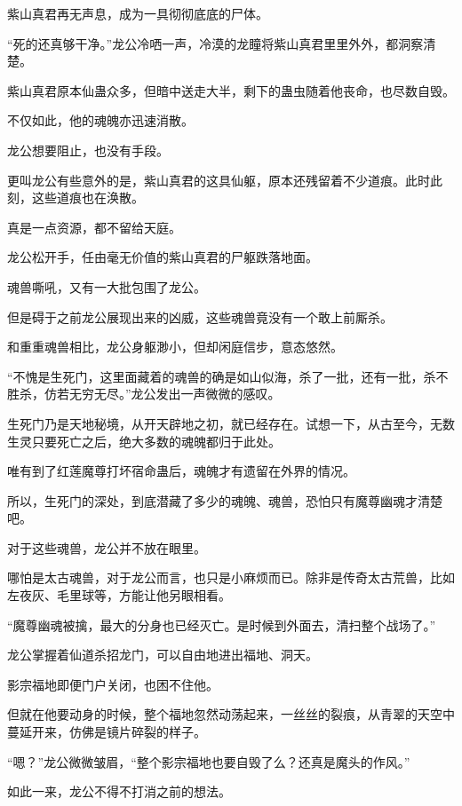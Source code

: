 
\begin{this_body}

紫山真君再无声息，成为一具彻彻底底的尸体。

“死的还真够干净。”龙公冷哂一声，冷漠的龙瞳将紫山真君里里外外，都洞察清楚。

紫山真君原本仙蛊众多，但暗中送走大半，剩下的蛊虫随着他丧命，也尽数自毁。

不仅如此，他的魂魄亦迅速消散。

龙公想要阻止，也没有手段。

更叫龙公有些意外的是，紫山真君的这具仙躯，原本还残留着不少道痕。此时此刻，这些道痕也在涣散。

真是一点资源，都不留给天庭。

龙公松开手，任由毫无价值的紫山真君的尸躯跌落地面。

魂兽嘶吼，又有一大批包围了龙公。

但是碍于之前龙公展现出来的凶威，这些魂兽竟没有一个敢上前厮杀。

和重重魂兽相比，龙公身躯渺小，但却闲庭信步，意态悠然。

“不愧是生死门，这里面藏着的魂兽的确是如山似海，杀了一批，还有一批，杀不胜杀，仿若无穷无尽。”龙公发出一声微微的感叹。

生死门乃是天地秘境，从开天辟地之初，就已经存在。试想一下，从古至今，无数生灵只要死亡之后，绝大多数的魂魄都归于此处。

唯有到了红莲魔尊打坏宿命蛊后，魂魄才有遗留在外界的情况。

所以，生死门的深处，到底潜藏了多少的魂魄、魂兽，恐怕只有魔尊幽魂才清楚吧。

对于这些魂兽，龙公并不放在眼里。

哪怕是太古魂兽，对于龙公而言，也只是小麻烦而已。除非是传奇太古荒兽，比如左夜灰、毛里球等，方能让他另眼相看。

“魔尊幽魂被擒，最大的分身也已经灭亡。是时候到外面去，清扫整个战场了。”

龙公掌握着仙道杀招龙门，可以自由地进出福地、洞天。

影宗福地即便门户关闭，也困不住他。

但就在他要动身的时候，整个福地忽然动荡起来，一丝丝的裂痕，从青翠的天空中蔓延开来，仿佛是镜片碎裂的样子。

“嗯？”龙公微微皱眉，“整个影宗福地也要自毁了么？还真是魔头的作风。”

如此一来，龙公不得不打消之前的想法。


\end{this_body}
